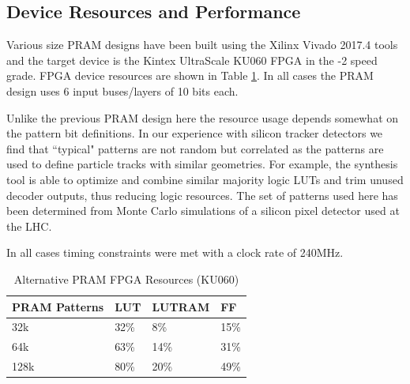 \documentclass[letterpaper]{article}
\begin{document}
\subsection{Device Resources and Performance}

Various size PRAM designs have been built using the Xilinx Vivado 2017.4 tools and the target device is the Kintex UltraScale KU060 FPGA in the -2 speed grade. FPGA device resources are shown in Table \ref{TableFPGA2}. In all cases the PRAM design uses 6 input buses/layers of 10 bits each.

Unlike the previous PRAM design here the resource usage depends somewhat on the pattern bit definitions. In our experience with silicon tracker detectors we find that ``typical" patterns are not random but correlated as the patterns are used to define particle tracks with similar geometries. For example, the synthesis tool is able to optimize and combine similar majority logic LUTs and trim unused decoder outputs, thus reducing logic resources. The set of patterns used here has been determined from Monte Carlo simulations of a silicon pixel detector used at the LHC. 

In all cases timing constraints were met with a clock rate of 240MHz. 

\begin{table}[htp]
\centering
\caption{Alternative PRAM FPGA Resources (KU060)} 
\label{TableFPGA2}
\begin{tabular}{|l|l|l|l|}
\hline
PRAM Patterns & LUT  & LUTRAM & FF   \\
\hline
32k           & 32\%  & 8\%   & 15\%  \\
64k           & 63\%  & 14\%  & 31\%  \\
128k          & 80\%  & 20\%  & 49\%  \\
\hline
\end{tabular}
\end{table}
\end{document}
